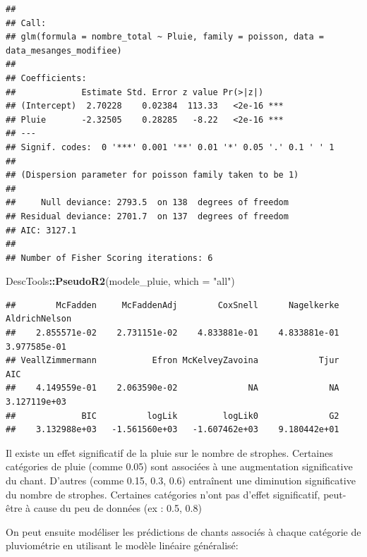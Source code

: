 \documentclass[
  french,
]{article}
\newenvironment{Shaded}{\begin{snugshade}}{\end{snugshade}}
\newcommand{\AttributeTok}[1]{\textcolor[rgb]{0.13,0.29,0.53}{#1}}
\newcommand{\FunctionTok}[1]{\textcolor[rgb]{0.13,0.29,0.53}{\textbf{#1}}}
\newcommand{\NormalTok}[1]{#1}
\newcommand{\SpecialCharTok}[1]{\textcolor[rgb]{0.81,0.36,0.00}{\textbf{#1}}}
\newcommand{\StringTok}[1]{\textcolor[rgb]{0.31,0.60,0.02}{#1}}
\begin{document}
\begin{verbatim}
## 
## Call:
## glm(formula = nombre_total ~ Pluie, family = poisson, data = data_mesanges_modifiee)
## 
## Coefficients:
##             Estimate Std. Error z value Pr(>|z|)    
## (Intercept)  2.70228    0.02384  113.33   <2e-16 ***
## Pluie       -2.32505    0.28285   -8.22   <2e-16 ***
## ---
## Signif. codes:  0 '***' 0.001 '**' 0.01 '*' 0.05 '.' 0.1 ' ' 1
## 
## (Dispersion parameter for poisson family taken to be 1)
## 
##     Null deviance: 2793.5  on 138  degrees of freedom
## Residual deviance: 2701.7  on 137  degrees of freedom
## AIC: 3127.1
## 
## Number of Fisher Scoring iterations: 6
\end{verbatim}

\begin{Shaded}
\begin{Highlighting}[]
\NormalTok{DescTools}\SpecialCharTok{::}\FunctionTok{PseudoR2}\NormalTok{(modele\_pluie, }\AttributeTok{which =} \StringTok{"all"}\NormalTok{)}
\end{Highlighting}
\end{Shaded}

\begin{verbatim}
##        McFadden     McFaddenAdj        CoxSnell      Nagelkerke   AldrichNelson 
##    2.855571e-02    2.731151e-02    4.833881e-01    4.833881e-01    3.977585e-01 
## VeallZimmermann           Efron McKelveyZavoina            Tjur             AIC 
##    4.149559e-01    2.063590e-02              NA              NA    3.127119e+03 
##             BIC          logLik         logLik0              G2 
##    3.132988e+03   -1.561560e+03   -1.607462e+03    9.180442e+01
\end{verbatim}

Il existe un effet significatif de la pluie sur le nombre de strophes.
Certaines catégories de pluie (comme 0.05) sont associées à une
augmentation significative du chant. D'autres (comme 0.15, 0.3, 0.6)
entraînent une diminution significative du nombre de strophes. Certaines
catégories n'ont pas d'effet significatif, peut-être à cause du peu de
données (ex : 0.5, 0.8)

On peut ensuite modéliser les prédictions de chants associés à chaque
catégorie de pluviométrie en utilisant le modèle linéaire généralisé:
\end{document}

